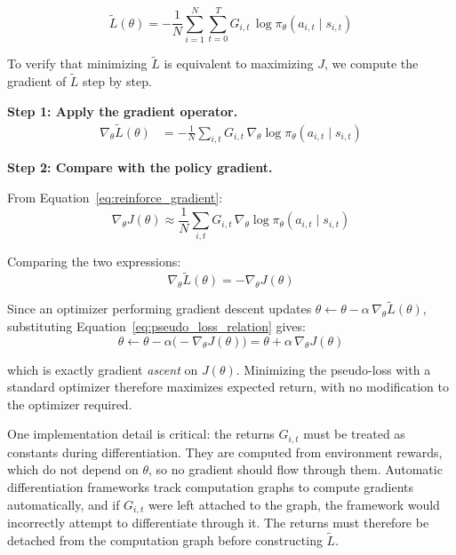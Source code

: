 \documentclass{book}
\begin{document}
\begin{equation}
\label{eq:pseudo_loss}
\tilde{L}(\theta) = -\frac{1}{N} \sum_{i=1}^{N} \sum_{t=0}^{T}
    G_{i,t}\, \log \pi_\theta(a_{i,t} \mid s_{i,t})
\end{equation}

To verify that minimizing $\tilde{L}$ is equivalent to maximizing $J$,
we compute the gradient of $\tilde{L}$ step by step.

\textbf{Step 1: Apply the gradient operator.}
\begin{align}
\nabla_\theta \tilde{L}(\theta)
&= -\frac{1}{N} \sum_{i,t} G_{i,t}\,
    \nabla_\theta \log \pi_\theta(a_{i,t} \mid s_{i,t})
\label{eq:pseudo_loss_grad_step1}
\end{align}


\textbf{Step 2: Compare with the policy gradient.}

From Equation~\ref{eq:reinforce_gradient}:
\begin{equation}
\nabla_\theta J(\theta) \approx \frac{1}{N} \sum_{i,t}
    G_{i,t}\, \nabla_\theta \log \pi_\theta(a_{i,t} \mid s_{i,t})
\end{equation}

Comparing the two expressions:
\begin{equation}
\label{eq:pseudo_loss_relation}
\nabla_\theta \tilde{L}(\theta) = -\nabla_\theta J(\theta)
\end{equation}

Since an optimizer performing gradient descent updates
$\theta \leftarrow \theta - \alpha\, \nabla_\theta \tilde{L}(\theta)$,
substituting Equation~\ref{eq:pseudo_loss_relation} gives:
\begin{equation}
\label{eq:pseudo_loss_ascent}
\theta \leftarrow \theta - \alpha\bigl(-\nabla_\theta J(\theta)\bigr)
= \theta + \alpha\, \nabla_\theta J(\theta)
\end{equation}

which is exactly gradient \emph{ascent} on $J(\theta)$. Minimizing
the pseudo-loss with a standard optimizer therefore maximizes expected
return, with no modification to the optimizer required.

One implementation detail is critical: the returns $G_{i,t}$ must be
treated as constants during differentiation. They are computed from
environment rewards, which do not depend on $\theta$, so no gradient
should flow through them. Automatic differentiation frameworks track
computation graphs to compute gradients automatically, and if $G_{i,t}$
were left attached to the graph, the framework would incorrectly attempt
to differentiate through it. The returns must therefore be detached from
the computation graph before constructing $\tilde{L}$.
\end{document}
